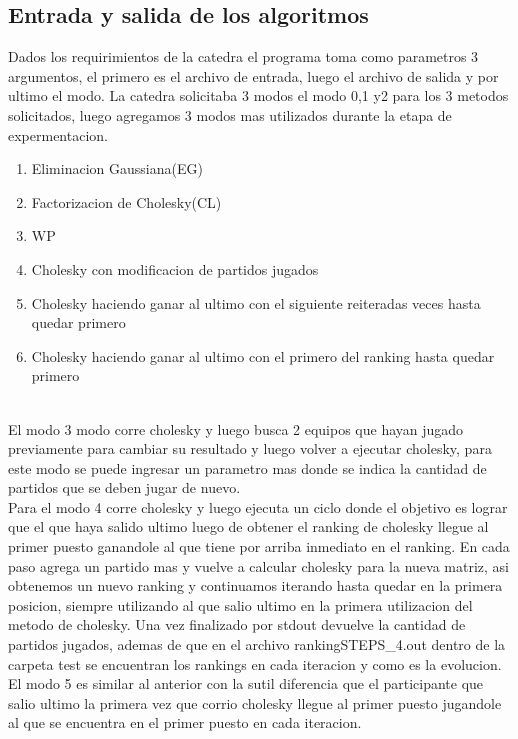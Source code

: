\subsection{Entrada y salida de los algoritmos}

Dados los requirimientos de la catedra el programa toma como parametros 3 argumentos, el primero es el archivo de entrada, luego el archivo de salida y
por ultimo el modo.  La catedra solicitaba 3 modos el modo 0,1 y2 para los 3 metodos solicitados, luego agregamos 3 modos mas utilizados durante la etapa de expermentacion.
\\
\begin{enumerate}
    \item Eliminacion Gaussiana(EG)
    \item Factorizacion de Cholesky(CL)
    \item WP
    \item Cholesky con modificacion de partidos jugados
    \item Cholesky haciendo ganar al ultimo con el siguiente reiteradas veces hasta quedar primero
    \item Cholesky haciendo ganar al ultimo con el primero del ranking hasta quedar primero
\end{enumerate}
\\
El modo 3 modo corre cholesky y luego busca 2 equipos que hayan jugado previamente para cambiar su resultado y luego volver a ejecutar cholesky,
para este modo se puede ingresar un parametro mas donde se indica la cantidad de partidos que se deben jugar de nuevo.
\\
Para el modo 4 corre cholesky y luego ejecuta un ciclo donde el objetivo es lograr que el que haya salido ultimo luego de obtener el ranking de cholesky llegue al primer puesto ganandole
al que tiene por arriba inmediato en el ranking. En cada paso agrega un partido mas y vuelve a calcular cholesky para la nueva matriz, asi obtenemos un nuevo ranking y continuamos iterando hasta quedar en la primera posicion, siempre utilizando al que salio ultimo en la primera utilizacion del metodo de cholesky.
Una vez finalizado por stdout devuelve la cantidad de partidos jugados, ademas de que en el archivo  rankingSTEPS\_4.out dentro de la carpeta test se encuentran los rankings en cada iteracion y como es la evolucion.
El modo 5 es similar al anterior con la sutil diferencia que el participante que salio ultimo la primera vez que corrio cholesky llegue al primer puesto jugandole al que se encuentra en el primer puesto en cada iteracion.
\newline
